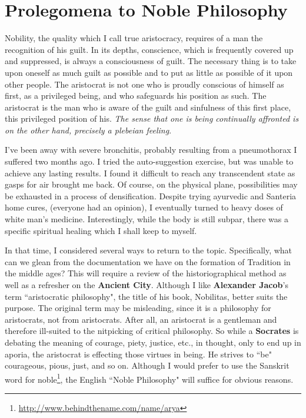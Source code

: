 \section{Prolegomena to Noble Philosophy}

\begin{quotex}
Nobility, the quality which I call true aristocracy, requires of a man the recognition of his guilt. In its depths, conscience, which is frequently covered up and suppressed, is always a consciousness of guilt. The necessary thing is to take upon oneself as much guilt as possible and to put as little as possible of it upon other people. The aristocrat is not one who is proudly conscious of himself as first, as a privileged being, and who safeguards his position as such. The aristocrat is the man who is aware of the guilt and sinfulness of this first place, this privileged position of his. \textit{The sense that one is being continually affronted is on the other hand, precisely a plebeian feeling}. 

\end{quotex}
I've been away with severe bronchitis, probably resulting from a pneumothorax I suffered two months ago. I tried the auto-suggestion exercise, but was unable to achieve any lasting results. I found it difficult to reach any transcendent state as gasps for air brought me back. Of course, on the physical plane, possibilities may be exhausted in a process of densification. Despite trying ayurvedic and Santeria home cures, (everyone had an opinion), I eventually turned to heavy doses of white man's medicine. Interestingly, while the body is still subpar, there was a specific spiritual healing which I shall keep to myself.

In that time, I considered several ways to return to the topic. Specifically, what can we glean from the documentation we have on the formation of Tradition in the middle ages? This will require a review of the historiographical method as well as a refresher on the \textbf{Ancient City}. Although I like \textbf{Alexander Jacob}'s term ``aristocratic philosophy", the title of his book, Nobilitas, better suits the purpose. The original term may be misleading, since it is a philosophy for aristocrats, not from aristocrats. After all, an aristocrat is a gentleman and therefore ill-suited to the nitpicking of critical philosophy. So while a \textbf{Socrates} is debating the meaning of courage, piety, justice, etc., in thought, only to end up in aporia, the aristocrat is effecting those virtues in being. He strives to ``be" courageous, pious, just, and so on. Although I would prefer to use the Sanskrit word for noble\footnote{\url{http://www.behindthename.com/name/arya}}, the English ``Noble Philosophy" will suffice for obvious reasons.

